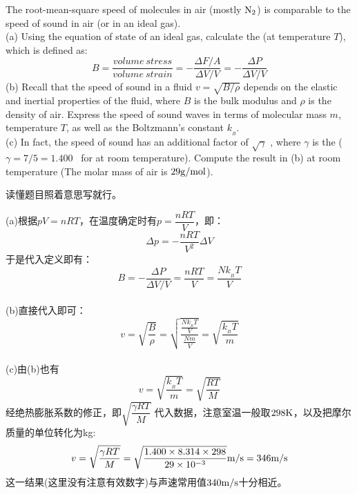     \begin{solution}
    	The root-mean-square 
    	speed of molecules in air (mostly $\rm{N_2}$) is comparable to 
    	the speed of sound in air (or in an ideal gas).\\
    	(a) Using the equation of state of an ideal gas, calculate the  (at temperature $T$), which is defined as:
    	\begin{equation*}
    		B = \frac{volume \ stress}{volume \ strain} = -\frac{\Delta F/A}{\Delta V/V} = -\frac{\Delta P}{\Delta V/V}
    	\end{equation*}
    	(b) Recall that the speed of sound in a fluid $v=\sqrt{B/\rho}$ depends on
    	the elastic and inertial properties of the fluid, where $B$ is the bulk
    	modulus and $\rho$ is the density of air. Express the speed of sound 
    	waves in terms of molecular mass $m$, temperature $T$, as well as 
    	the Boltzmann's constant $k_{_B}$.\\
    	(c) In fact, the speed of sound has an additional factor of $\sqrt{\gamma}$ ,
    	where $\gamma$ is the  ($\gamma = 7/5 = 1.400$ \ for  
    	at room temperature). Compute the result in (b) at room temperature (The molar
    	mass of air is $29 \rm{g/mol}$). 
    	
    	\tcbrule
    	
        读懂题目照着意思写就行。

        (a)根据$pV=nRT$，在温度确定时有$p=\dfrac{nRT}{V}$，即：
        \begin{equation*}
            \Delta p = -\frac{nRT}{V^{2}}\Delta V
        \end{equation*}
        于是代入定义即有：
        \begin{equation*}
            B = -\frac{\Delta P}{\Delta V/V} = \frac{nRT}{V}=\frac{Nk_{_B}T}{V}
        \end{equation*}
        \\
        (b)直接代入即可：
        \begin{equation*}
            v=\sqrt{\frac{B}{\rho}}=\sqrt{\dfrac{\frac{Nk_{_B}T}{V}}{\frac{Nm}{V}}}=\sqrt{\frac{k_{_B}T}{m}}
        \end{equation*}
        \\
        (c)由(b)也有
        \[v=\sqrt{\frac{k_{_B}T}{m}}=\sqrt{\frac{RT}{M}}\]
        经绝热膨胀系数的修正，即$\sqrt{\dfrac{\gamma RT}{M}}$
        代入数据，注意室温一般取$298\rm{K}$，以及把摩尔质量的单位转化为kg:
        \begin{equation*}
            v=\sqrt{\frac{\gamma RT}{M}} =\sqrt{\frac{1.400\times8.314\times 298}{29\times 10^{-3}}}\rm{m/s} = 346\rm{m/s}
        \end{equation*}
        这一结果(这里没有注意有效数字)与声速常用值$340\rm{m/s}$十分相近。
    \end{solution}
    
